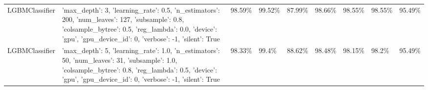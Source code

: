 \begin{tabular}{lllllllll}
LGBMClassifier & {'max_depth': 3, 'learning_rate': 0.5, 'n_estimators': 200, 'num_leaves': 127, 'subsample': 0.8, 'colsample_bytree': 0.5, 'reg_lambda': 0.0, 'device': 'gpu', 'gpu_device_id': 0, 'verbose': -1, 'silent': True} & 98.59\% & 99.52\% & 87.99\% & 98.66\% & 98.55\% & 98.55\% & 95.49\% \\
LGBMClassifier & {'max_depth': 5, 'learning_rate': 1.0, 'n_estimators': 50, 'num_leaves': 31, 'subsample': 1.0, 'colsample_bytree': 0.8, 'reg_lambda': 0.5, 'device': 'gpu', 'gpu_device_id': 0, 'verbose': -1, 'silent': True} & 98.33\% & 99.4\% & 88.62\% & 98.48\% & 98.15\% & 98.2\% & 95.49\% \\
\bottomrule
\end{tabular}
